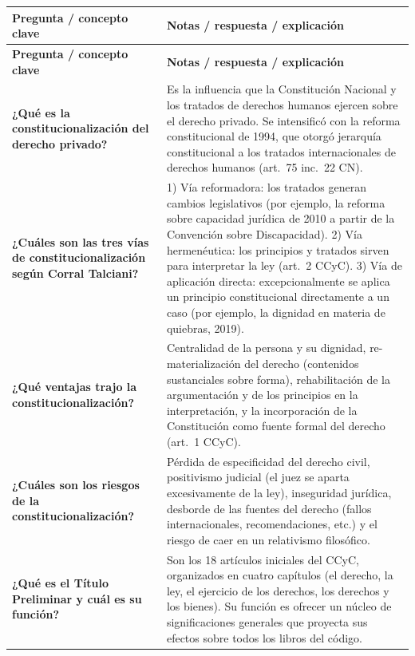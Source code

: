 \documentclass[12pt,oneside]{book}
\begin{document}
\begin{longtable}{|p{}|p{}|}
\hline
\textbf{Pregunta / concepto clave} & \textbf{Notas / respuesta / explicación} \\
\hline
\endfirsthead
\hline
\textbf{Pregunta / concepto clave} & \textbf{Notas / respuesta / explicación} \\
\hline
\endhead
\hline
\endfoot
\hline
\endlastfoot

\textbf{¿Qué es la constitucionalización del derecho privado?} & Es la influencia que la Constitución Nacional y los tratados de derechos humanos ejercen sobre el derecho privado. Se intensificó con la reforma constitucional de 1994, que otorgó jerarquía constitucional a los tratados internacionales de derechos humanos (art.\ 75 inc.\ 22 CN). \\
\hline

\textbf{¿Cuáles son las tres vías de constitucionalización según Corral Talciani?} & 1) Vía reformadora: los tratados generan cambios legislativos (por ejemplo, la reforma sobre capacidad jurídica de 2010 a partir de la Convención sobre Discapacidad). 2) Vía hermenéutica: los principios y tratados sirven para interpretar la ley (art.\ 2 CCyC). 3) Vía de aplicación directa: excepcionalmente se aplica un principio constitucional directamente a un caso (por ejemplo, la dignidad en materia de quiebras, 2019). \\
\hline

\textbf{¿Qué ventajas trajo la constitucionalización?} & Centralidad de la persona y su dignidad, re-materialización del derecho (contenidos sustanciales sobre forma), rehabilitación de la argumentación y de los principios en la interpretación, y la incorporación de la Constitución como fuente formal del derecho (art.\ 1 CCyC). \\
\hline

\textbf{¿Cuáles son los riesgos de la constitucionalización?} & Pérdida de especificidad del derecho civil, positivismo judicial (el juez se aparta excesivamente de la ley), inseguridad jurídica, desborde de las fuentes del derecho (fallos internacionales, recomendaciones, etc.) y el riesgo de caer en un relativismo filosófico. \\
\hline

\textbf{¿Qué es el Título Preliminar y cuál es su función?} & Son los 18 artículos iniciales del CCyC, organizados en cuatro capítulos (el derecho, la ley, el ejercicio de los derechos, los derechos y los bienes). Su función es ofrecer un núcleo de significaciones generales que proyecta sus efectos sobre todos los libros del código. \\
\hline


\end{longtable}
\end{document}
